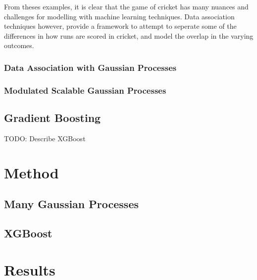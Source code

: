 \documentclass[12pt,a4paper]{report}
\theoremstyle{definition}
\begin{document}
From theses examples, it is clear that the game of cricket has many nuances and challenges for modelling with machine learning techniques. 
Data association techniques however, provide a framework to attempt to seperate some of the differences in how runs are scored in cricket, and model the overlap in the varying outcomes.

\subsection{Data Association with Gaussian Processes}

\citep{Kaiser2018}

\subsection{Modulated Scalable Gaussian Processes}

\citep{Lui2020}

\section{Gradient Boosting}

TODO: Describe XGBoost


\chapter{Method}

\section{Many Gaussian Processes}

\section{XGBoost}

\chapter{Results}
\end{document}
